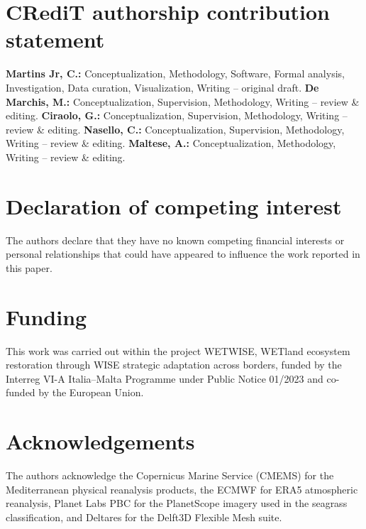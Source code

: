 \documentclass[review,12pt,authoryear]{elsarticle}
\begin{document}
\section*{CRediT authorship contribution statement}
\textbf{Martins Jr, C.:} Conceptualization, Methodology, Software, Formal
analysis, Investigation, Data curation, Visualization, Writing -- original
draft. \textbf{De Marchis, M.:} Conceptualization, Supervision, Methodology,
Writing -- review \& editing. \textbf{Ciraolo, G.:} Conceptualization,
Supervision, Methodology, Writing -- review \& editing. \textbf{Nasello, C.:}
Conceptualization, Supervision, Methodology, Writing -- review \& editing.
\textbf{Maltese, A.:} Conceptualization, Methodology, Writing -- review \&
editing.

\section*{Declaration of competing interest}
The authors declare that they have no known competing financial interests or
personal relationships that could have appeared to influence the work reported
in this paper.

\section*{Funding}
This work was carried out within the project WETWISE, WETland ecosystem
restoration through WISE strategic adaptation across borders, funded by the
Interreg VI-A Italia--Malta Programme under Public Notice 01/2023 and
co-funded by the European Union.

\section*{Acknowledgements}

The authors acknowledge the Copernicus Marine Service
(CMEMS) for the Mediterranean physical reanalysis products, the ECMWF for ERA5
atmospheric reanalysis, Planet Labs PBC for the PlanetScope imagery used in
the seagrass classification, and Deltares for the Delft3D Flexible Mesh suite.
\end{document}
